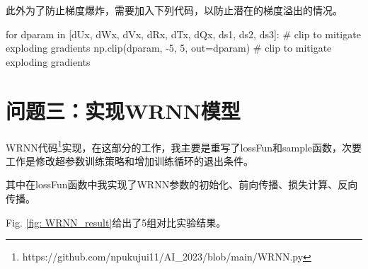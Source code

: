 \documentclass[letterpaper,12pt]{article}
\begin{document}
	此外为了防止梯度爆炸，需要加入下列代码，以防止潜在的梯度溢出的情况。
	
	\begin{python}
		for dparam in [dUx, dWx, dVx, dRx, dTx, dQx, ds1, ds2, ds3]:  # clip to mitigate exploding gradients
			np.clip(dparam, -5, 5, out=dparam)  # clip to mitigate exploding gradients
	\end{python}
	
	
	\section{问题三：实现WRNN模型}
	
	WRNN代码\footnote{https://github.com/npukujui11/AI\_2023/blob/main/WRNN.py}实现，在这部分的工作，我主要是重写了lossFun和sample函数，次要工作是修改超参数训练策略和增加训练循环的退出条件。
	
	其中在lossFun函数中我实现了WRNN参数的初始化、前向传播、损失计算、反向传播。
	
	Fig. \ref{fig: WRNN_result}给出了5组对比实验结果。
	
\end{document}
